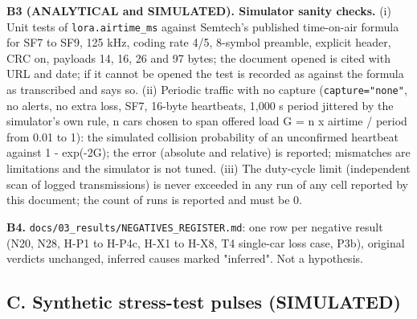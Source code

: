 \textbf{B3 (ANALYTICAL and SIMULATED). Simulator sanity checks.} (i) Unit tests of \texttt{lora.airtime\_ms} against Semtech's published time-on-air formula for SF7 to SF9, 125 kHz, coding rate 4/5, 8-symbol preamble, explicit header, CRC on, payloads 14, 16, 26 and 97 bytes; the document opened is cited with URL and date; if it cannot be opened the test is recorded as against the formula as transcribed and says so. (ii) Periodic traffic with no capture (\texttt{capture="none"}, no alerts, no extra loss, SF7, 16-byte heartbeats, 1,000 s period jittered by the simulator's own rule, n cars chosen to span offered load G = n x airtime / period from 0.01 to 1): the simulated collision probability of an unconfirmed heartbeat against 1 - exp(-2G); the error (absolute and relative) is reported; mismatches are limitations and the simulator is not tuned. (iii) The duty-cycle limit (independent scan of logged transmissions) is never exceeded in any run of any cell reported by this document; the count of runs is reported and must be 0.

\textbf{B4.} \texttt{docs/03\_results/NEGATIVES\_REGISTER.md}: one row per negative result (N20, N28, H-P1 to H-P4c, H-X1 to H-X8, T4 single-car loss case, P3b), original verdicts unchanged, inferred causes marked "inferred". Not a hypothesis.

\subsection*{C. Synthetic stress-test pulses (SIMULATED)}

